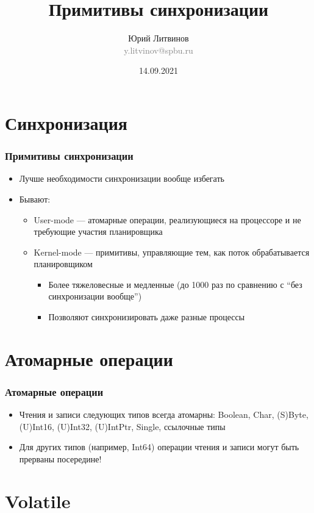 \documentclass[xetex,mathserif,serif]{beamer}
\title{Примитивы синхронизации}
\author[Юрий Литвинов]{Юрий Литвинов\\\small{\textcolor{gray}{y.litvinov@spbu.ru}}}
\date{14.09.2021}
\begin{document}
    \frame{\titlepage}

    \section{Синхронизация}

    \begin{frame}
        \frametitle{Примитивы синхронизации}
        \begin{itemize}
            \item Лучше необходимости синхронизации вообще избегать
            \item Бывают:
            \begin{itemize}
                \item User-mode --- атомарные операции, реализующиеся на процессоре и не требующие участия планировщика
                \item Kernel-mode --- примитивы, управляющие тем, как поток обрабатывается планировщиком
                \begin{itemize}
                    \item Более тяжеловесные и медленные (до 1000 раз по сравнению с ``без синхронизации вообще'')
                    \item Позволяют синхронизировать даже разные процессы
                \end{itemize}
            \end{itemize}
        \end{itemize}
    \end{frame}

    \section{Атомарные операции}

    \begin{frame}
        \frametitle{Атомарные операции}
        \begin{itemize}
            \item Чтения и записи следующих типов всегда атомарны: Boolean, Char, (S)Byte, (U)Int16, (U)Int32, (U)IntPtr, Single, ссылочные типы
            \item Для других типов (например, Int64) операции чтения и записи могут быть прерваны посередине!
        \end{itemize}
    \end{frame}

    \section{Volatile}
\end{document}
